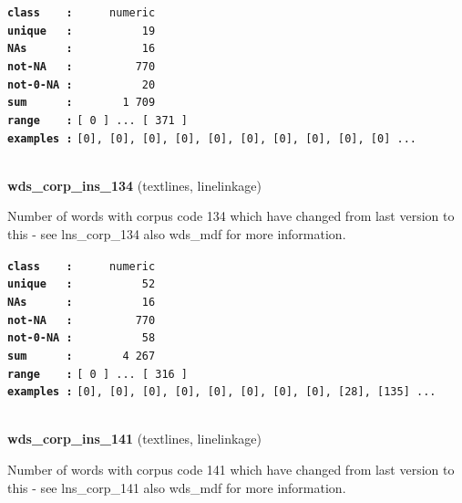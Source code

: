 \documentclass[]{article}
\begin{document}
\textbf{\texttt{class\ \ \ \ :}} \texttt{~~~~~numeric}\\
\textbf{\texttt{unique\ \ \ :}} \texttt{~~~~~~~~~~19}\\
\textbf{\texttt{NAs\ \ \ \ \ \ :}} \texttt{~~~~~~~~~~16}\\
\textbf{\texttt{not-NA\ \ \ :}} \texttt{~~~~~~~~~770}\\
\textbf{\texttt{not-0-NA\ :}} \texttt{~~~~~~~~~~20}\\
\textbf{\texttt{sum\ \ \ \ \ \ :}} \texttt{~~~~~~~1~709}\\
\textbf{\texttt{range\ \ \ \ :}}
\texttt{{[}\ 0\ {]}\ ...\ {[}\ 371\ {]}}\\
\textbf{\texttt{examples\ :}}
\texttt{{[}0{]},\ {[}0{]},\ {[}0{]},\ {[}0{]},\ {[}0{]},\ {[}0{]},\ {[}0{]},\ {[}0{]},\ {[}0{]},\ {[}0{]}\ ...}\\

~

\textbf{wds\_corp\_ins\_134} (textlines, linelinkage)

Number of words with corpus code 134 which have changed from last
version to this - see lns\_corp\_134 also wds\_mdf for more information.

\textbf{\texttt{class\ \ \ \ :}} \texttt{~~~~~numeric}\\
\textbf{\texttt{unique\ \ \ :}} \texttt{~~~~~~~~~~52}\\
\textbf{\texttt{NAs\ \ \ \ \ \ :}} \texttt{~~~~~~~~~~16}\\
\textbf{\texttt{not-NA\ \ \ :}} \texttt{~~~~~~~~~770}\\
\textbf{\texttt{not-0-NA\ :}} \texttt{~~~~~~~~~~58}\\
\textbf{\texttt{sum\ \ \ \ \ \ :}} \texttt{~~~~~~~4~267}\\
\textbf{\texttt{range\ \ \ \ :}}
\texttt{{[}\ 0\ {]}\ ...\ {[}\ 316\ {]}}\\
\textbf{\texttt{examples\ :}}
\texttt{{[}0{]},\ {[}0{]},\ {[}0{]},\ {[}0{]},\ {[}0{]},\ {[}0{]},\ {[}0{]},\ {[}0{]},\ {[}28{]},\ {[}135{]}\ ...}\\

~

\textbf{wds\_corp\_ins\_141} (textlines, linelinkage)

Number of words with corpus code 141 which have changed from last
version to this - see lns\_corp\_141 also wds\_mdf for more information.
\end{document}
